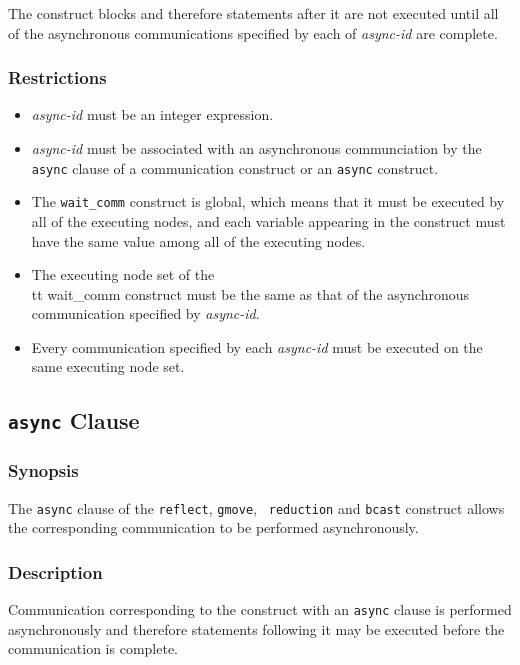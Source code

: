 The {\tt {}} construct blocks and therefore
statements after it are not executed until all of the asynchronous
communications specified by each of {\it async-id} are complete. 

\subsubsection*{Restrictions}

\begin{itemize}
\item {\it async-id} must be an integer expression.
\item {\it async-id} must be associated with an asynchronous
      communciation by the {\tt async} clause of a communication
      construct or an {\tt async} construct.
\item The {\tt wait\_comm} construct is global, which means that it must
      be executed by all of the executing nodes, and each variable
      appearing in the construct must have the same value among all of
      the executing nodes.
\item The executing node set of the {\\tt wait\_comm} construct must be
      the same as that of the asynchronous communication specified by
      {\it async-id}.
\item Every communication specified by each {\it async-id} must be
      executed on the same executing node set.
\end{itemize}


\subsection{{\tt async} Clause}

\subsubsection*{Synopsis}

The {\tt async} clause of the {\tt reflect}, {\tt gmove}, {\tt
reduction} and {\tt bcast} construct allows the corresponding
communication to be performed asynchronously.

\subsubsection*{Description}

Communication corresponding to the construct with an {\tt async} clause
is performed asynchronously and therefore statements following it may be
executed before the communication is complete.

